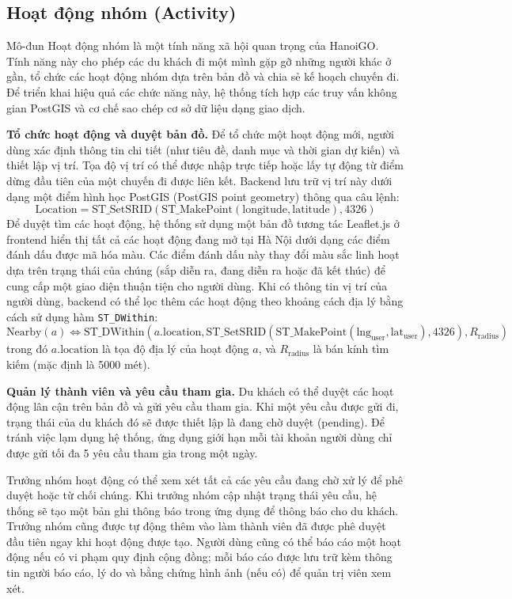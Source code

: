 \documentclass[a4paper,12pt]{report}
\begin{document}
\subsection{Hoạt động nhóm (Activity)}

Mô-đun Hoạt động nhóm là một tính năng xã hội quan trọng của HanoiGO. Tính năng này cho phép các du khách đi một mình gặp gỡ những người khác ở gần, tổ chức các hoạt động nhóm dựa trên bản đồ và chia sẻ kế hoạch chuyến đi. Để triển khai hiệu quả các chức năng này, hệ thống tích hợp các truy vấn không gian PostGIS và cơ chế sao chép cơ sở dữ liệu dạng giao dịch.

\textbf{Tổ chức hoạt động và duyệt bản đồ.}
Để tổ chức một hoạt động mới, người dùng xác định thông tin chi tiết (như tiêu đề, danh mục và thời gian dự kiến) và thiết lập vị trí. Tọa độ vị trí có thể được nhập trực tiếp hoặc lấy tự động từ điểm dừng đầu tiên của một chuyến đi được liên kết. Backend lưu trữ vị trí này dưới dạng một điểm hình học PostGIS (PostGIS point geometry) thông qua câu lệnh:
\[
\text{Location} = \text{ST\_SetSRID}(\text{ST\_MakePoint}(\text{longitude}, \text{latitude}), 4326)
\]
Để duyệt tìm các hoạt động, hệ thống sử dụng một bản đồ tương tác Leaflet.js ở frontend hiển thị tất cả các hoạt động đang mở tại Hà Nội dưới dạng các điểm đánh dấu được mã hóa màu. Các điểm đánh dấu này thay đổi màu sắc linh hoạt dựa trên trạng thái của chúng (sắp diễn ra, đang diễn ra hoặc đã kết thúc) để cung cấp một giao diện thuận tiện cho người dùng. Khi có thông tin vị trí của người dùng, backend có thể lọc thêm các hoạt động theo khoảng cách địa lý bằng cách sử dụng hàm \texttt{ST\_DWithin}:
\[
\text{Nearby}(a) \iff \text{ST\_DWithin}(a.\text{location}, \text{ST\_SetSRID}(\text{ST\_MakePoint}(\text{lng}_{\text{user}}, \text{lat}_{\text{user}}), 4326), R_{\text{radius}})
\]
trong đó $a.\text{location}$ là tọa độ địa lý của hoạt động $a$, và $R_{\text{radius}}$ là bán kính tìm kiếm (mặc định là 5000 mét).

\textbf{Quản lý thành viên và yêu cầu tham gia.}
Du khách có thể duyệt các hoạt động lân cận trên bản đồ và gửi yêu cầu tham gia. Khi một yêu cầu được gửi đi, trạng thái của du khách đó sẽ được thiết lập là đang chờ duyệt (pending). Để tránh việc lạm dụng hệ thống, ứng dụng giới hạn mỗi tài khoản người dùng chỉ được gửi tối đa 5 yêu cầu tham gia trong một ngày.

Trưởng nhóm hoạt động có thể xem xét tất cả các yêu cầu đang chờ xử lý để phê duyệt hoặc từ chối chúng. Khi trưởng nhóm cập nhật trạng thái yêu cầu, hệ thống sẽ tạo một bản ghi thông báo trong ứng dụng để thông báo cho du khách. Trưởng nhóm cũng được tự động thêm vào làm thành viên đã được phê duyệt đầu tiên ngay khi hoạt động được tạo. Người dùng cũng có thể báo cáo một hoạt động nếu có vi phạm quy định cộng đồng; mỗi báo cáo được lưu trữ kèm thông tin người báo cáo, lý do và bằng chứng hình ảnh (nếu có) để quản trị viên xem xét.
\end{document}
